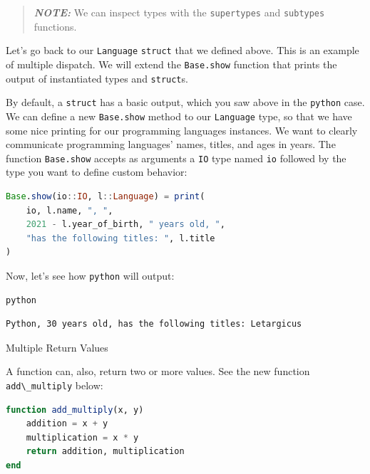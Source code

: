\documentclass[
  notoc %
]{tufte-book}
\makeatletter
\newcommand{\passthrough}[1]{#1}
\renewcommand\subsubsection{%
\@startsection{subsubsection}{3}{\z@ }{-3.25ex\@plus -1ex \@minus -.2ex}{1.5ex \@plus .2ex}{\normalfont \normalsize \bfseries }
}
\makeatother
\begin{document}
\begin{quote}
\textbf{\emph{NOTE:}} We can inspect types with the
\passthrough{\lstinline!supertypes!} and
\passthrough{\lstinline!subtypes!} functions.
\end{quote}

Let's go back to our \passthrough{\lstinline!Language!}
\passthrough{\lstinline!struct!} that we defined above. This is an
example of multiple dispatch. We will extend the
\passthrough{\lstinline!Base.show!} function that prints the output of
instantiated types and \passthrough{\lstinline!struct!}s.

By default, a \passthrough{\lstinline!struct!} has a basic output, which
you saw above in the \passthrough{\lstinline!python!} case. We can
define a new \passthrough{\lstinline!Base.show!} method to our
\passthrough{\lstinline!Language!} type, so that we have some nice
printing for our programming languages instances. We want to clearly
communicate programming languages' names, titles, and ages in years. The
function \passthrough{\lstinline!Base.show!} accepts as arguments a
\passthrough{\lstinline!IO!} type named \passthrough{\lstinline!io!}
followed by the type you want to define custom behavior:

\begin{lstlisting}[language=Julia]
Base.show(io::IO, l::Language) = print(
    io, l.name, ", ",
    2021 - l.year_of_birth, " years old, ",
    "has the following titles: ", l.title
)
\end{lstlisting}

Now, let's see how \passthrough{\lstinline!python!} will output:

\begin{lstlisting}[language=Julia]
python
\end{lstlisting}

\begin{lstlisting}[language=Output]
Python, 30 years old, has the following titles: Letargicus
\end{lstlisting}

\hypertarget{sec:function_multiple}{%
\subsubsection{Multiple Return Values}\label{sec:function_multiple}}

A function can, also, return two or more values. See the new function
\passthrough{\lstinline!add\_multiply!} below:

\begin{lstlisting}[language=Julia]
function add_multiply(x, y)
    addition = x + y
    multiplication = x * y
    return addition, multiplication
end
\end{lstlisting}
\end{document}
